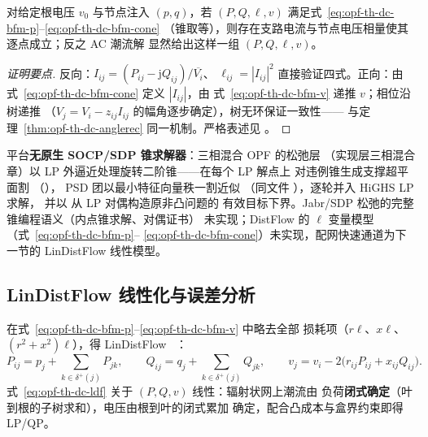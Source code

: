 \begin{proposition}\label{prop:opf-th-dc-bfmeq}
对给定根电压 $v_0$ 与节点注入 $(p,q)$，若
$(P,Q,\ell,v)$ 满足式~\eqref{eq:opf-th-dc-bfm-p}--\eqref{eq:opf-th-dc-bfm-cone}
（锥取等），则存在支路电流与节点电压相量使其逐点成立；反之 AC 潮流解
显然给出这样一组 $(P,Q,\ell,v)$。
\end{proposition}

\begin{proof}[证明要点]
反向：$I_{ij}=(P_{ij}-\mathrm jQ_{ij})/\overline{V_i}$、
$\ell_{ij}=|I_{ij}|^2$ 直接验证四式。正向：由
式~\eqref{eq:opf-th-dc-bfm-cone} 定义 $|I_{ij}|$，由
式~\eqref{eq:opf-th-dc-bfm-v} 递推 $v$；相位沿树递推
（$V_j=V_i-z_{ij}I_{ij}$ 的幅角逐步确定），树无环保证一致性——
与定理~\ref{thm:opf-th-dc-anglerec} 同一机制。严格表述见
\cite{opfdc:farivar-low}。
\end{proof}

\begin{gapnote}
平台\textbf{无原生 SOCP/SDP 锥求解器}：三相混合 OPF 的松弛层
（实现层三相混合章）以 LP 外逼近处理旋转二阶锥——在每个 LP 解点上
对违例锥生成支撑超平面割
（），
PSD 团以最小特征向量秩一割近似
（同文件 ），逐轮并入 HiGHS LP 求解，
并以  从 LP 对偶构造原非凸问题的
有效目标下界。Jabr/SDP 松弛的完整锥编程语义（内点锥求解、对偶证书）
未实现；DistFlow 的 $\ell$ 变量模型（式~\eqref{eq:opf-th-dc-bfm-p}--%
\eqref{eq:opf-th-dc-bfm-cone}）未实现，配网快速通道为下一节的
LinDistFlow 线性模型。
\end{gapnote}

\subsection{LinDistFlow 线性化与误差分析}\label{sec:opf-th-dc-ldf}

\begin{definition}[LinDistFlow]\label{def:opf-th-dc-ldf}
在式~\eqref{eq:opf-th-dc-bfm-p}--\eqref{eq:opf-th-dc-bfm-v} 中略去全部
损耗项（$r\ell$、$x\ell$、$(r^2+x^2)\ell$），得 LinDistFlow
~\cite{opfdc:baran-wu}：
\begin{equation}
P_{ij}=p_j+\sum_{k\in\delta^+(j)}P_{jk},\qquad
Q_{ij}=q_j+\sum_{k\in\delta^+(j)}Q_{jk},\qquad
v_j=v_i-2\bigl(r_{ij}P_{ij}+x_{ij}Q_{ij}\bigr).
\label{eq:opf-th-dc-ldf}
\end{equation}
式~\eqref{eq:opf-th-dc-ldf} 关于 $(P,Q,v)$ 线性：辐射状网上潮流由
负荷\textbf{闭式确定}（叶到根的子树求和），电压由根到叶的闭式累加
确定，配合凸成本与盒界约束即得 LP/QP。
\end{definition}

